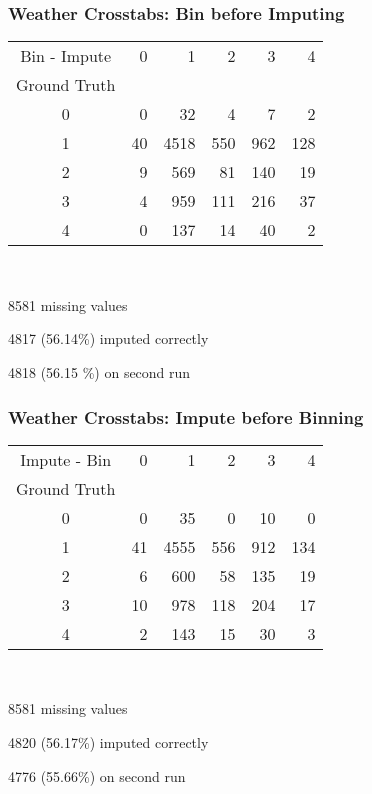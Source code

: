 \begin{frame}[t]
	\frametitle{Weather Crosstabs:  Bin before Imputing}
	\Large

\begin{tabular}{crrrrr}
Bin - Impute &   0 &     1 &    2 &     3 &    4 \\
Ground Truth &     &       &      &       &      \\
\hline
0              &   0 &    32 &    4 &    7 &    2 \\
1              &  40 &  4518 &  550 &  962 &  128 \\
2              &   9 &   569 &   81 &  140 &   19 \\
3              &   4 &   959 &  111 &  216 &   37 \\
4              &   0 &   137 &   14 &   40 &    2 \\
\end{tabular}

\

8581 missing values

4817 (56.14\%) imputed correctly

4818 (56.15 \%) on second run

\end{frame}


\begin{frame}[t]
	\frametitle{Weather Crosstabs:  Impute before Binning}
	\Large

\begin{tabular}{crrrrr}
Impute - Bin &   0 &     1 &    2 &     3 &    4 \\
Ground Truth &     &       &      &       &      \\
\hline
0              &   0 &    35 &    0 &   10 &    0 \\
1              &  41 &  4555 &  556 &  912 &  134 \\
2              &   6 &   600 &   58 &  135 &   19 \\
3              &  10 &   978 &  118 &  204 &   17 \\
4              &   2 &   143 &   15 &   30 &    3 \\
\end{tabular}

\

8581 missing values

4820 (56.17\%) imputed correctly

4776 (55.66\%) on second run

\end{frame}

